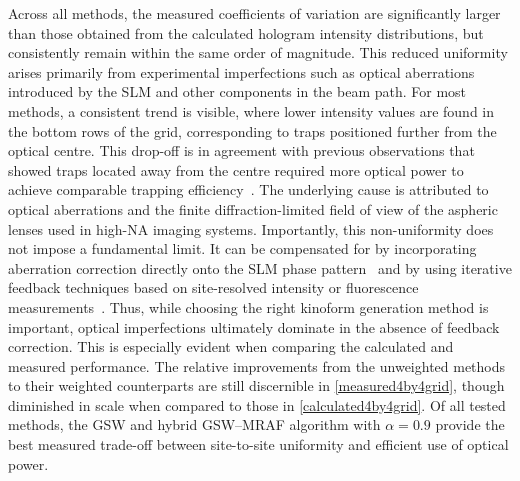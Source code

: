 \documentclass[../Thesis-IJspeert.tex]{subfiles}
\begin{document}
Across all methods, the measured coefficients of variation are significantly larger than those obtained from the calculated hologram intensity distributions, but consistently remain within the same order of magnitude. This reduced uniformity arises primarily from experimental imperfections such as optical aberrations introduced by the SLM and other components in the beam path. For most methods, a consistent trend is visible, where lower intensity values are found in the bottom rows of the grid, corresponding to traps positioned further from the optical centre. This drop-off is in agreement with previous observations that showed traps located away from the centre required more optical power to achieve comparable trapping efficiency~\cite{Schymik2022}. The underlying cause is attributed to optical aberrations and the finite diffraction-limited field of view of the aspheric lenses used in high-NA imaging systems. Importantly, this non-uniformity does not impose a fundamental limit. It can be compensated for by incorporating aberration correction directly onto the SLM phase pattern~\cite{imr2010,Kim2019} and by using iterative feedback techniques based on site-resolved intensity or fluorescence measurements~\cite{Tamura2016,Schymik2022}. Thus, while choosing the right kinoform generation method is important, optical imperfections ultimately dominate in the absence of feedback correction. This is especially evident when comparing the calculated and measured performance. The relative improvements from the unweighted methods to their weighted counterparts are still discernible in \autoref{measured4by4grid}, though diminished in scale when compared to those in \autoref{calculated4by4grid}. Of all tested methods, the GSW and hybrid GSW--MRAF algorithm with $\alpha = 0.9$ provide the best measured trade-off between site-to-site uniformity and efficient use of optical power.
\end{document}
